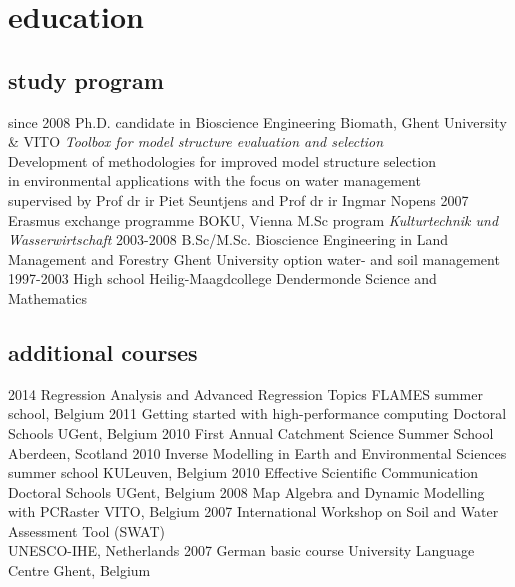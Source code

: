 \documentclass[]{stvhoey-cv}  %
\begin{document}
\section{education}
\subsection*{study program}
\begin{entrylist}
  \entry
    {since 2008}
    {Ph.D. {\normalfont candidate in Bioscience Engineering}}
    {Biomath, Ghent University \& VITO}
    {\emph{Toolbox for model structure evaluation and selection}\\
    Development of methodologies for improved model structure selection\\ in environmental applications with the focus on water management\\ \small{supervised by Prof dr ir Piet Seuntjens and Prof dr ir Ingmar Nopens}}
  \entry
    {2007}
    {Erasmus exchange programme}
    {BOKU, Vienna}
    {M.Sc program \textit{Kulturtechnik und Wasserwirtschaft}}
  \entry
    {2003-2008}
    {B.Sc/M.Sc. Bioscience Engineering in Land Management and Forestry}
    {Ghent University}
    {option water- and soil management}
  \entry
    {1997-2003}
    {High school}
    {Heilig-Maagdcollege Dendermonde}
    {Science and Mathematics}
\end{entrylist}

\subsection*{additional courses}
\begin{entrylist}
  \shortentry
    {2014}
    {Regression Analysis and Advanced Regression Topics}
    {FLAMES summer school, Belgium}
  \shortentry
    {2011}
    {Getting started with high-performance computing}
    {Doctoral Schools UGent, Belgium}
  \shortentry
    {2010}
    {First Annual Catchment Science Summer School}
    {Aberdeen, Scotland}
  \shortentry
    {2010}
    {Inverse Modelling in Earth and Environmental Sciences}
    {summer school KULeuven, Belgium}
  \shortentry
    {2010}
    {Effective Scientific Communication}
    {Doctoral Schools UGent, Belgium}
  \shortentry
    {2008}
    {Map Algebra and Dynamic Modelling with PCRaster}
    {VITO, Belgium}
  \shortentry
    {2007}
    {International Workshop on Soil and Water Assessment Tool (SWAT)\\ }
    {UNESCO-IHE, Netherlands}
  \shortentry
    {2007}
    {German basic course}
    {University Language Centre Ghent, Belgium}
\end{entrylist}
\end{document}
